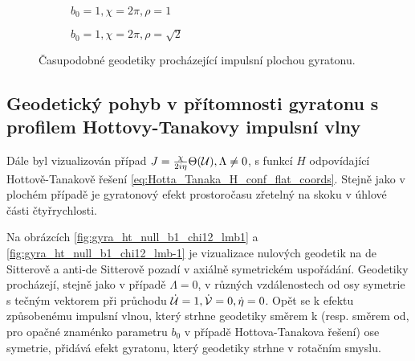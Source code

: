 \begin{figure}[H]
    \centering
    \begin{subfigure}[b]{0.48\textwidth}
        \caption{$b_0=1, \chi=2\pi, \rho=1$}
    \end{subfigure}
    \begin{subfigure}[b]{0.48\textwidth}
        \caption{$b_0=1, \chi=2\pi, \rho=\sqrt{2}$} 
    \end{subfigure}
    \caption{Časupodobné geodetiky procházející impulsní plochou gyratonu.}
    \label{fig:gyra_flat_timelike_b1_chi1_2_vxy_skewed}
\end{figure}

\subsection{Geodetický pohyb v přítomnosti gyratonu s profilem Hottovy-Tanakovy impulsní vlny}
Dále byl vizualizován případ $J = \frac{\chi}{2 i \eta} \Theta(\mathcal{U}), \Lambda \not= 0$, s funkcí $H$ odpovídající
Hottově-Tanakově řešení \eqref{eq:Hotta_Tanaka_H_conf_flat_coords}.
Stejně jako v plochém případě je gyratonový efekt prostoročasu zřetelný na skoku v úhlové části čtyřrychlosti.

Na obrázcích \ref{fig:gyra_ht_null_b1_chi12_lmb1} a \ref{fig:gyra_ht_null_b1_chi12_lmb-1} je vizualizace nulových geodetik na de Sitterově a anti-de Sitterově pozadí v axiálně symetrickém uspořádání.
Geodetiky procházejí, stejně jako v případě $\Lambda = 0$, v různých vzdálenostech od osy symetrie s tečným vektorem při průchodu $\dot{\mathcal{U}} = 1, \dot{\mathcal{V}}=0, \dot\eta=0$.
Opět se k efektu způsobenému impulsní vlnou, který strhne geodetiky směrem k (resp. směrem od, pro opačné znaménko parametru $b_0$ v případě Hottova-Tanakova řešení) ose symetrie, přidává efekt gyratonu,
který geodetiky strhne v rotačním smyslu.

